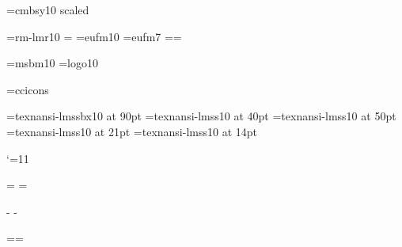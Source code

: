 






\newdimen\hpage \newdimen\vpage %

\newif\ifportada \portadafalse

\def\[{\string\[} %



\font\fonttwosym=cmbsy10 scaled
\def\Stitle{{\fonttwosym \char"78}}

\lmfonts\lmtitles\ansifont
 \font\tenrm=rm-lmr10 =\tenrm
\font\frakx=eufm10
\font\frakvii=eufm7
\newfam\frakfam \textfont\frakfam=\frakx \scriptfont\frakfam=\frakvii
\def\frak{\fam\frakfam\frakx}

\font\msbm=msbm10
\font\logo=logo10

\font\ccicons=ccicons
\def\ccbysa{{\ccicons \char0\kern1pt\char1\kern1pt\char2}}

\font\ptitlefont=texnansi-lmssbx10 at 90pt
\font\psubtitlefont=texnansi-lmss10 at 40pt
\font\pauthorfont=texnansi-lmss10 at 50pt
\font\pcitafont=texnansi-lmss10 at 21pt
\font\ptextfont=texnansi-lmss10 at 14pt

\def\pdfBlack{\pdfliteral{0 0 0 1 k 0 0 0 1 K}}
\def\pdfWhite{\pdfliteral{0 0 0 0 k 0 0 0 0 K}}
\def\pdfRed{\pdfliteral{0 1 1 0 k 0 1 1 0 K}}
\def\pdfBlue{\pdfliteral{1 1 0 0 k 1 1 0 0 K}}
\def\pdfGreen{\pdfliteral{1 0 1 0 k 1 0 1 0 K}}

\catcode`\@=11


\let\docinfo\relax \let\infodoc\relax

\headline={\hfil}
\footline={\tenrm\ifodd\pageno \docinfo\hfil\folio
            \else \folio\hfil\infodoc \fi\strut}

\hpage=6in \hsize=10.5cm
 \hoffset\hpage \advance\hoffset-\hsize \divide{}
 \advance\hoffset-1in
\vpage=9in \baselineskip \advance\vsize\topskip %
 \voffset\vpage \advance\voffset-\vsize \advance{}\baselineskip
 \divide{} \advance\voffset-1in

\pdfcode \pdfpageheight=\vpage \pdfpagewidth=\hpage \pdfendcode

\]
